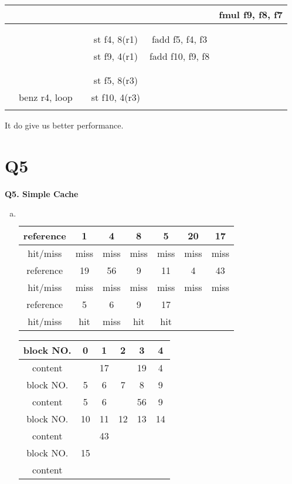 \documentclass[12pt]{article}
\begin{document}
\begin{CJK*}{UTF8}{gbsn}
\begin{enumerate}[a)]
\begin{table}[!hbp]
{\begin{tabular}{|c|c|c|c|c|c|}
\hline 
 &  &  &  &  & fmul f9, f8, f7 \\ 
\hline 
 &  &  &  &  &  \\ 
\hline 
 &  &  &  &  &  \\ 
\hline 
 &  &  & st f4, 8(r1) & fadd f5, f4, f3 &  \\ 
\hline 
 &  &  & st f9, 4(r1) & fadd f10, f9, f8 &  \\ 
\hline 
 &  &  &  &  &  \\ 
\hline 
 &  &  &  &  &  \\ 
\hline 
 &  &  & st f5, 8(r3) &  &  \\ 
\hline 
 & benz r4, loop &  & st f10, 4(r3) &  &  \\ 
\hline 
 &  &  &  &  &  \\ 
\hline 
\end{tabular} 
}
\end{table}

It do give us better performance.

\end{enumerate}

\section{Q5}
\textbf{Q5. Simple Cache}

\begin{enumerate}[a)]

\item
$ $\\
\begin{tabular}{|c|c|c|c|c|c|c|}
\hline 
reference	& 1 		& 4 		& 8 		&5& 20 	& 17 	 \\ 
\hline 
hit/miss		& miss 	& miss 	& miss 	&miss& miss 	& miss 	 \\ 
\hline 
reference &19& 56 & 9 & 11 & 4 & 43  \\ 
\hline 
hit/miss &miss& miss & miss & miss & miss & miss  \\ 
\hline
reference &5& 6 & 9 & 17 &&\\
\hline
hit/miss &hit& miss & hit &hit&&\\
\hline 
\end{tabular} 

\begin{tabular}{|c|c|c|c|c|c|}
\hline 
block NO. &0 & 1 & 2 & 3 & 4  \\ 
\hline 
content && 17 &  & 19 & 4  \\ 
\hline 
block NO. &5& 6 & 7 & 8 & 9  \\ 
\hline 
content &5& 6 &  & 56 & 9   \\ 
\hline 
block NO. &10& 11 & 12 & 13 & 14  \\ 
\hline 
content & & 43 &  &  &    \\ 
\hline
block NO. & 15 &&&&\\
\hline
content & &&&&\\
\hline 
\end{tabular} 


\end{enumerate}
\end{CJK*}
\end{document}

